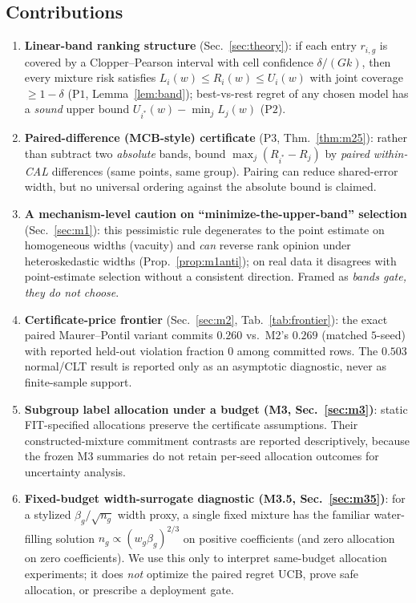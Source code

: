 \documentclass{article}
\begin{document}
\subsection{Contributions}
\begin{enumerate}
\item \textbf{Linear-band ranking structure} (Sec.~\ref{sec:theory}): if each entry
$r_{i,g}$ is covered by a Clopper--Pearson interval with cell confidence
$\delta/(G k)$, then every mixture risk satisfies $L_i(w)\le R_i(w)\le U_i(w)$ with joint
coverage $\ge 1-\delta$ ($\mathrm{P1}$, Lemma~\ref{lem:band}); best-vs-rest regret of any
chosen model has a \emph{sound} upper bound $U_{i^*}(w)-\min_j L_j(w)$ ($\mathrm{P2}$).
\item \textbf{Paired-difference (MCB-style) certificate} ($\mathrm{P3}$, Thm.~\ref{thm:m25}):
rather than subtract two \emph{absolute} bands, bound $\max_j(R_{i^*}-R_j)$ by
\emph{paired within-CAL} differences (same points, same group). Pairing can reduce shared-error
width, but no universal ordering against the absolute bound is claimed.
\item \textbf{A mechanism-level caution on ``minimize-the-upper-band'' selection}
(Sec.~\ref{sec:m1}): this pessimistic rule degenerates to the point estimate on homogeneous
widths (vacuity) and \emph{can} reverse rank opinion under heteroskedastic widths
(Prop.~\ref{prop:m1anti}); on real data it disagrees with point-estimate selection without a
consistent direction. Framed as \emph{bands gate, they do not choose}.
\item \textbf{Certificate-price frontier} (Sec.~\ref{sec:m2}, Tab.~\ref{tab:frontier}): the
exact paired Maurer--Pontil variant commits $0.260$ vs.\ M2's $0.269$ (matched $5$-seed) with
reported held-out violation fraction $0$ among committed rows. The $0.503$ normal/CLT result is reported only as an
asymptotic diagnostic, never as finite-sample support.
\item \textbf{Subgroup label allocation under a budget (M3, Sec.~\ref{sec:m3})}: static
FIT-specified allocations preserve the certificate assumptions. Their constructed-mixture
commitment contrasts are reported descriptively, because the frozen M3 summaries do not retain
per-seed allocation outcomes for uncertainty analysis.
\item \textbf{Fixed-budget width-surrogate diagnostic (M3.5, Sec.~\ref{sec:m35})}: for a
stylized $\beta_g/\sqrt{n_g}$ width proxy, a single fixed mixture has the familiar
water-filling solution $n_g\propto(w_g\beta_g)^{2/3}$ on positive coefficients (and zero
allocation on zero coefficients). We use this only to interpret
same-budget allocation experiments; it does \emph{not} optimize the paired regret UCB, prove
safe allocation, or prescribe a deployment gate.
\end{enumerate}
\end{document}
